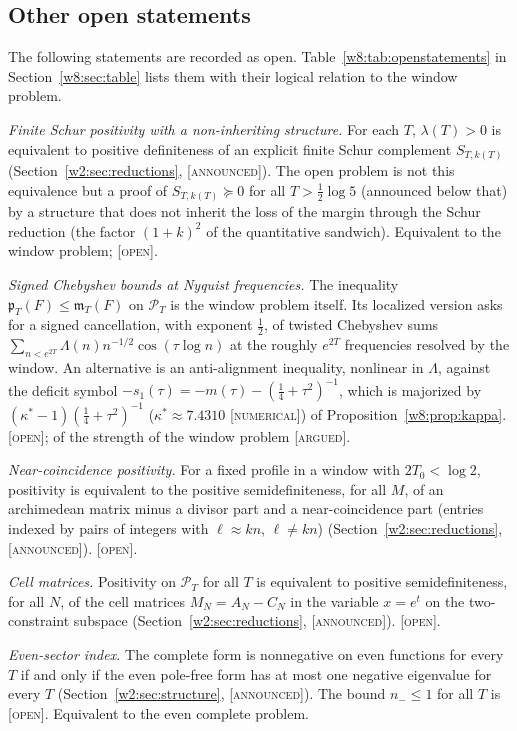 \documentclass[11pt]{amsart}
\theoremstyle{definition}
\theoremstyle{remark}
\numberwithin{equation}{section}
\newcommand{\PT}{\mathcal{P}_T}                        %
\newcommand{\mT}{\mathfrak{m}_T}                       %
\newcommand{\pT}{\mathfrak{p}_T}                       %
\newcommand{\lam}{\lambda(T)}                          %
\newcommand{\stag}[1]{\textsc{[#1]}}
\newcommand{\ARGUED}{\stag{argued}}
\newcommand{\NUM}{\stag{numerical}}
\newcommand{\OPENQ}{\stag{open}}
\newcommand{\ANNOUNCED}{\stag{announced}}
\begin{document}
\subsection{Other open statements}

The following statements are recorded as open. Table~\ref{w8:tab:openstatements} in Section~\ref{w8:sec:table} lists
them with their logical relation to the window problem.

\emph{Finite Schur positivity with a non-inheriting structure.} For each $T$, $\lam>0$ is equivalent to positive
definiteness of an explicit finite Schur complement $S_{T,k(T)}$ (Section~\ref{w2:sec:reductions}, \ANNOUNCED). The open
problem is not this equivalence but a proof of $S_{T,k(T)}\succeq0$ for all $T>\frac12\log5$ (announced below that) by a structure that does not
inherit the loss of the margin through the Schur reduction (the factor $(1+k)^2$ of the quantitative sandwich).
Equivalent to the window problem; \OPENQ.

\emph{Signed Chebyshev bounds at Nyquist frequencies.} The inequality $\pT(F)\le\mT(F)$ on $\PT$ is the window problem
itself. Its localized version asks for a signed cancellation, with exponent $\frac12$, of twisted Chebyshev sums
$\sum_{n<e^{2T}}\Lambda(n)n^{-1/2}\cos(\tau\log n)$ at the roughly $e^{2T}$ frequencies resolved by the window. An
alternative is an anti-alignment inequality, nonlinear in $\Lambda$, against the deficit symbol
$-s_1(\tau)=-m(\tau)-(\frac14+\tau^2)^{-1}$, which is majorized by $(\kappa^*-1)(\frac14+\tau^2)^{-1}$ ($\kappa^*\approx7.4310$ \NUM) of Proposition~\ref{w8:prop:kappa}. \OPENQ; of the strength of the window problem
\ARGUED.

\emph{Near-coincidence positivity.} For a fixed profile in a window with $2T_0<\log2$, positivity is equivalent to the
positive semidefiniteness, for all $M$, of an archimedean matrix minus a divisor part and a near-coincidence part
(entries indexed by pairs of integers with $\ell\approx kn$, $\ell\ne kn$) (Section~\ref{w2:sec:reductions}, \ANNOUNCED). \OPENQ.

\emph{Cell matrices.} Positivity on $\PT$ for all $T$ is equivalent to positive semidefiniteness, for all $N$, of the
cell matrices $M_N=A_N-C_N$ in the variable $x=e^t$ on the two-constraint subspace (Section~\ref{w2:sec:reductions},
\ANNOUNCED). \OPENQ.

\emph{Even-sector index.} The complete form is nonnegative on even functions for every $T$ if and only if the even
pole-free form has at most one negative eigenvalue for every $T$ (Section~\ref{w2:sec:structure}, \ANNOUNCED). The bound
$n_-\le1$ for all $T$ is \OPENQ. Equivalent to the even complete problem.
\end{document}
